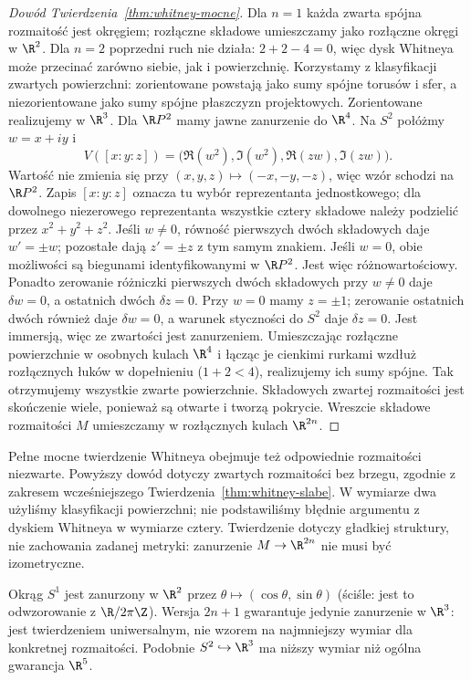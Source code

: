 \begin{proof}[Dowód Twierdzenia~\ref{thm:whitney-mocne}]
Dla $n=1$ każda zwarta spójna
rozmaitość jest okręgiem;
rozłączne składowe umieszczamy
jako rozłączne okręgi w $\R^2$.
Dla $n=2$ poprzedni ruch nie
działa: $2+2-4=0$, więc dysk
Whitneya może przecinać
zarówno siebie, jak i powierzchnię.
Korzystamy z klasyfikacji
zwartych powierzchni:
zorientowane powstają jako
sumy spójne torusów i sfer,
a niezorientowane jako sumy
spójne płaszczyzn projektowych.
Zorientowane realizujemy w $\R^3$.
Dla $\R P^2$ mamy jawne zanurzenie
do $\R^4$. Na $S^2$ połóżmy
$w=x+iy$ i
\[
 V([x:y:z])
   =\bigl(\Re(w^2),
           \Im(w^2),
           \Re(zw),
           \Im(zw)\bigr).
\]
Wartość nie zmienia się przy
$(x,y,z)\mapsto(-x,-y,-z)$,
więc wzór schodzi na $\R P^2$. Zapis $[x:y:z]$
oznacza tu wybór reprezentanta jednostkowego;
dla dowolnego niezerowego reprezentanta wszystkie
cztery składowe należy podzielić przez $x^2+y^2+z^2$.
Jeśli $w\ne0$, równość pierwszych
dwóch składowych daje $w'=\pm w$;
pozostałe dają $z'=\pm z$
z tym samym znakiem. Jeśli $w=0$,
obie możliwości są biegunami
identyfikowanymi w $\R P^2$.
Jest więc różnowartościowy.
Ponadto zerowanie różniczki
pierwszych dwóch składowych
przy $w\ne0$ daje $\delta w=0$,
a ostatnich dwóch $\delta z=0$.
Przy $w=0$ mamy $z=\pm1$;
zerowanie ostatnich dwóch
również daje $\delta w=0$,
a warunek styczności do $S^2$
daje $\delta z=0$. Jest immersją,
więc ze zwartości jest zanurzeniem.
Umieszczając rozłączne powierzchnie
w osobnych kulach $\R^4$ i łącząc
je cienkimi rurkami wzdłuż
rozłącznych łuków w dopełnieniu
($1+2<4$), realizujemy ich
sumy spójne. Tak otrzymujemy
wszystkie zwarte powierzchnie.
Składowych zwartej rozmaitości jest skończenie
wiele, ponieważ są otwarte i tworzą pokrycie.
Wreszcie składowe rozmaitości $M$ umieszczamy w rozłącznych
kulach $\R^{2n}$.
\end{proof}

\begin{uwaga}
Pełne mocne twierdzenie Whitneya
obejmuje też odpowiednie rozmaitości
niezwarte. Powyższy dowód dotyczy
zwartych rozmaitości bez brzegu,
zgodnie z zakresem wcześniejszego
Twierdzenia~\ref{thm:whitney-slabe}.
W wymiarze dwa użyliśmy
klasyfikacji powierzchni; nie
podstawiliśmy błędnie argumentu
z dyskiem Whitneya w wymiarze cztery.
Twierdzenie dotyczy gładkiej struktury,
nie zachowania zadanej metryki:
zanurzenie $M\to\R^{2n}$ nie musi
być izometryczne.
\end{uwaga}

\begin{przyklad}
Okrąg $S^1$ jest zanurzony w $\R^2$ przez
$\theta\mapsto(\cos\theta,\sin\theta)$
(ściśle: jest to odwzorowanie z $\R/2\pi\Z$).
Wersja $2n+1$ gwarantuje jedynie
zanurzenie w $\R^3$: jest twierdzeniem
uniwersalnym, nie wzorem na najmniejszy
wymiar dla konkretnej rozmaitości.
Podobnie $S^2\hookrightarrow\R^3$ ma
niższy wymiar niż ogólna gwarancja $\R^5$.
\end{przyklad}

